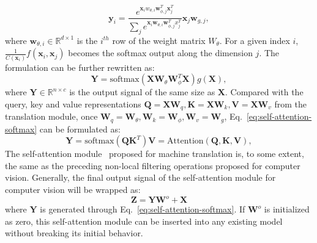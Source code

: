 \begin{equation}
	\mathbf y_i = \frac{e^{\mathbf x_iw_{\theta,i}\mathbf w_{\phi,j}^T\mathbf x_j^T}}{\sum_j{e^{\mathbf x_i\mathbf w_{\theta,i}\mathbf w_{\phi,j}^Tx_j^T}}}\mathbf x_j\mathbf w_{g,j},
\end{equation}
where $\mathbf w_{\theta,i}\in \mathbb{R}^{d\times 1}$ is the $i^{th}$ row of the weight matrix $W_{\theta}$. For a given index $i$, $\frac{1}{C(\mathbf x_i)}f(\mathbf x_i, \mathbf x_j)$ becomes the softmax output along the dimension $j$. The formulation can be further rewritten as:
\begin{equation}
	\mathbf Y = \mathrm{softmax}(\mathbf X\mathbf W_{\theta}\mathbf W_{\phi}^T\mathbf X)g(\mathbf X),
	\label{eq:self-attention-softmax}
\end{equation}
where $\mathbf Y\in \mathbb{R}^{n\times c}$ is the output signal of the same size as $\mathbf X$.
Compared with the query, key and value representations $\mathbf Q=\mathbf X\mathbf W_q, \mathbf K=\mathbf X\mathbf W_k, \mathbf V=\mathbf X\mathbf W_v$ from the translation module, once $\mathbf W_q=\mathbf W_{\theta}, \mathbf W_k=\mathbf W_{\phi}, \mathbf W_v=\mathbf W_g$, Eq.~\ref{eq:self-attention-softmax} can be formulated as:
\begin{equation}
	\mathbf Y = \mathrm{softmax}(\mathbf Q\mathbf K^T)\mathbf V = \mathrm{Attention}(\mathbf Q, \mathbf K, \mathbf V),
\end{equation}
The self-attention module~ proposed for machine translation is, to some extent, the same as the preceding non-local filtering operations proposed for computer vision.
Generally, the final output signal of the self-attention module for computer vision will be wrapped as:
\begin{equation}
	\mathbf Z = \mathbf Y\mathbf W^o + \mathbf X
\end{equation}
where $\mathbf Y$ is generated through Eq.~\ref{eq:self-attention-softmax}. If $\mathbf W^o$ is initialized as zero, this self-attention module can be inserted into any existing model without breaking its initial behavior.
